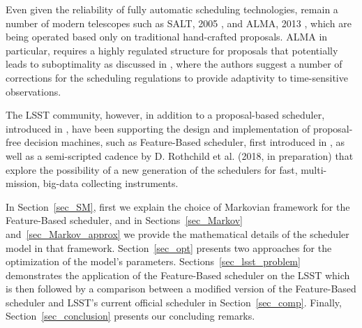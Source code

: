 \documentclass[12pt]{aastex62}
\theoremstyle{definition}
\begin{document}
Even given the reliability of fully automatic scheduling technologies, remain a number of modern telescopes such as SALT, 2005 \citep{brink2008salt}, and ALMA, 2013 \citep{wootten2003atacama}, which are being operated based only on traditional hand-crafted proposals. ALMA in particular, requires a highly regulated structure for proposals that potentially leads to suboptimality as discussed in \citep{alexander2017enabling}, where the authors suggest a number of corrections for the scheduling regulations to provide adaptivity to time-sensitive observations.

The LSST community, however, in addition to a proposal-based scheduler, introduced in \citep{delgado2016lsst}, have been supporting the design and implementation of proposal-free decision machines, such as Feature-Based scheduler, first introduced in \citep{naghib2016feature}, as well as a semi-scripted cadence by D. Rothchild et al. (2018, in preparation) that explore the possibility of a new generation of the schedulers for fast, multi-mission, big-data collecting instruments.

In Section~\ref{sec_SM}, first we explain the choice of Markovian framework for the Feature-Based scheduler, and in Sections~\ref{sec_Markov} and~\ref{sec_Markov_approx} we provide the mathematical details of the scheduler model in that framework. Section~\ref{sec_opt} presents two approaches for the optimization of the model's parameters. Sections~\ref{sec_lsst_problem} demonstrates the application of the Feature-Based scheduler on the LSST which is then followed by a comparison between a modified version of the Feature-Based scheduler and LSST's current official scheduler in Section~\ref{sec_comp}. Finally, Section~\ref{sec_conclusion} presents our concluding remarks.
\end{document}
